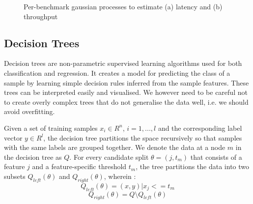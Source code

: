 \begin{figure}
\centering
{}
%

\caption{Per-benchmark gaussian processes to estimate (a) latency and
  (b) throughput}
\label{fig:gp_r2}
\end{figure}


\subsection{Decision Trees}
\label{sec:dt}

Decision trees are non-parametric supervised learning algorithms used for
both classification and regression.
It creates a model for predicting the class of a sample by learning
simple decision rules inferred from the sample features\citep{stats01}.
These trees can be interpreted easily and visualised.
We however need to be careful not to create overly complex trees
that do not generalise the data well, i.e. we should avoid overfitting.

Given a set of training samples $x_i \in R^n$, $i=1,...,l$ and the
corresponding label vector $y \in R^l$, the decision tree partitions
the space recursively so that samples with the same labels are grouped
together.
We denote the data at a node $m$ in the decision tree as $Q$. For
every candidate split $\theta = (j, t_m)$ that consists of a feature $j$
and a feature-specific threshold $t_m$, the tree partitions the data into
two subsets $Q_{left}(\theta)$ and $Q_{right}(\theta)$, wherein :
$$Q_{left}(\theta) = {(x, y) | x_j <= t_m}$$
$$Q_{right}(\theta) = Q \setminus Q_{left}(\theta)$$

